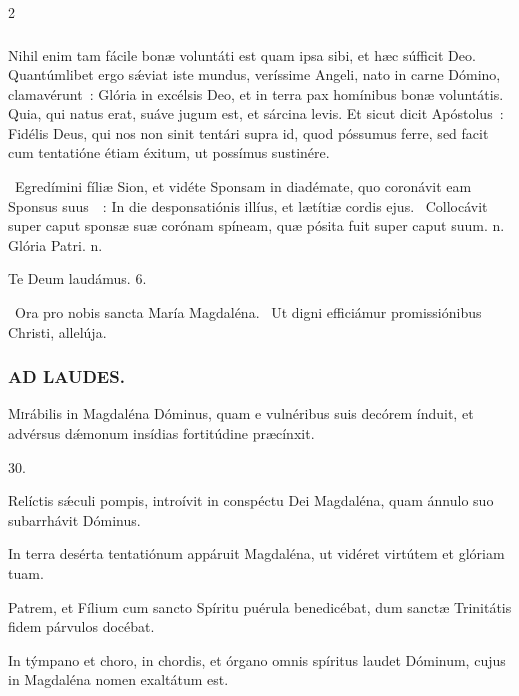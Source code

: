 \documentclass[9pt,twoside]{extarticle}
\begin{document}
\begin{multicols}{2}
{{\subsubsection*{\center {}}
Nihil enim tam fácile bonæ voluntáti est quam ipsa sibi, et hæc súfficit Deo. Quantúmlibet ergo sǽviat iste mundus, veríssime Angeli, nato in carne Dómino, clamavérunt~: Glória in excélsis Deo, et in terra pax homínibus bonæ voluntátis. Quia, qui natus erat, suáve jugum est, et sárcina levis. Et sicut dicit Apóstolus~: Fidélis Deus, qui nos non sinit tentári supra id, quod póssumus ferre, sed facit cum tentatióne étiam éxitum, ut possímus sustinére.

\begin{tightlist}{}
\item {}~Egredímini fíliæ Sion, et vidéte Sponsam in diadémate, quo coronávit eam Sponsus suus~~: \textred{*} In die desponsatiónis illíus, et lætítiæ cordis ejus. ~Collocávit super caput sponsæ suæ corónam spíneam, quæ pósita fuit super caput suum. n. Glória Patri. n.
\item Te Deum laudámus. 6.
\item {}~Ora pro nobis sancta María Magdaléna. ~Ut digni efficiámur promissiónibus Christi, allelúja.
\end{tightlist}

\subsubsection*{\center \textsc{AD LAUDES.}}
\begin{center}\end{center}
\lettrine{M}irábilis in Magdaléna Dóminus, quam e vulnéribus suis decórem índuit, et advérsus dǽmonum insídias fortitúdine præcínxit.

\begin{tightlist}{}
\item {} 30.
\item {} Relíctis sǽculi pompis, introívit in conspéctu Dei Magdaléna, quam ánnulo suo subarrhávit Dóminus.
\item {} In terra desérta tentatiónum appáruit Magdaléna, ut vidéret virtútem et glóriam tuam.
\item {} Patrem, et Fílium cum sancto Spíritu puérula benedicébat, dum sanctæ Trinitátis fidem párvulos docébat.
\item {} In týmpano et choro, in chordis, et órgano omnis spíritus laudet Dóminum, cujus in Magdaléna nomen exaltátum est.
\end{tightlist}

}}
\end{multicols}
\end{document}
